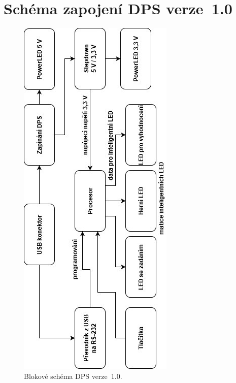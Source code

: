 \chapter{Schéma zapojení DPS verze~1.0}

\begin{figure}[!h]
    \begin{center}
      \includegraphics[scale=1.1]{prilohy/v1_blokove_schema.jpg}
    \end{center}
    \caption[Blokové schéma DPS verze~1.0]{Blokové schéma DPS verze~1.0.}
  \end{figure}







  



